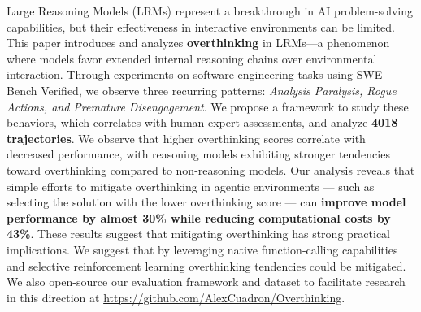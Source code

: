 Large Reasoning Models (LRMs) represent a breakthrough in AI problem-solving capabilities, but their effectiveness in interactive environments can be limited. This paper introduces and analyzes \textbf{overthinking} in LRMs—a phenomenon where models favor extended internal reasoning chains over environmental interaction. Through experiments on software engineering tasks using SWE Bench Verified, we observe three recurring patterns: \textit{Analysis Paralysis, Rogue Actions, and Premature Disengagement}. We propose a framework to study these behaviors, which correlates with human expert assessments, and analyze \textbf{4018 trajectories}. We observe that higher overthinking scores correlate with decreased performance, with reasoning models exhibiting stronger tendencies toward overthinking compared to non-reasoning models. Our analysis reveals that simple efforts to mitigate overthinking in agentic environments — such as selecting the solution with the lower overthinking score — can \textbf{improve model performance by almost 30\% while reducing computational costs by 43\%}. These results suggest that mitigating overthinking has strong practical implications. We suggest that by leveraging native function-calling capabilities and selective reinforcement learning overthinking tendencies could be mitigated. We also open-source our evaluation framework and dataset to facilitate research in this direction at \url{https://github.com/AlexCuadron/Overthinking}.
